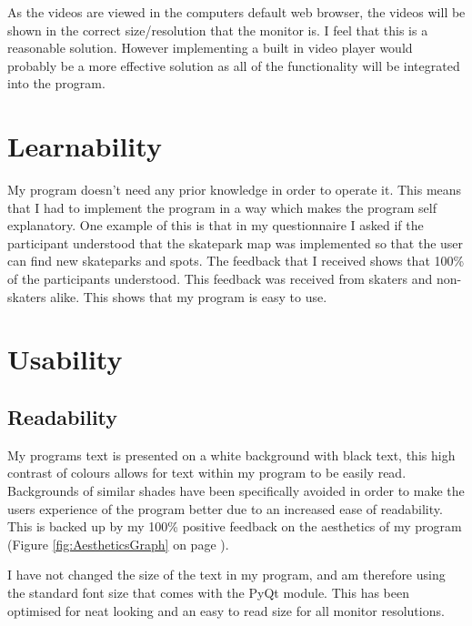 As the videos are viewed in the computers default web browser, the videos will be shown in the correct size/resolution that the monitor is. I feel that this is a reasonable solution. However implementing a built in video player would probably be a more effective solution as all of the functionality will be integrated into the program. 











\section{Learnability} %

My program doesn't need any prior knowledge in order to operate it. This means that I had to implement the program in a way which makes the program self explanatory. One example of this is that in my questionnaire I asked if the participant understood that the skatepark map was implemented so that the user can find new skateparks and spots. The feedback that I received shows that 100\% of the participants understood. This feedback was received from skaters and non-skaters alike. This shows that my program is easy to use.



\section{Usability} %

	\subsection{Readability}

My programs text is presented on a white background with black text, this high contrast of colours allows for text within my program to be easily read. Backgrounds of similar shades have been specifically avoided in order to make the users experience of the program better due to an increased ease of readability. This is backed up by my 100\% positive feedback on the aesthetics of my program (Figure \ref{fig:AestheticsGraph} on page \pageref{fig:AestheticsGraph}).

I have not changed the size of the text in my program, and am therefore using the standard font size that comes with the PyQt module. This has been optimised for neat looking and an easy to read size for all monitor resolutions. 

